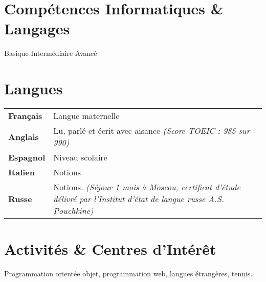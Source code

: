 \documentclass[10pt, a4paper]{article}
\begin{document}
\section{Compétences Informatiques \& Langages}
\vspace{-0.5em}
\begin{skillslisting}
	\skills{\threeskill}{\python}
	\skills{\twoskill}{\bootstrap}
	\skills{\threeskill}{\html}
	\skills{\threeskill}{\sass}
	\skills{\threeskill}{\js}
	\skills{\threeskill}{\jquery}
	\skills{\twoskill}{\react}
	\skills{\oneskill}{\angular}
	\skills{\threeskill}{\sql}
	\skills{\twoskill}{\git}
	\skills{\twoskill}{\patterns}
	\skills{\oneskill}{\visb}
	\skills{\twoskill}{\LaTeX}
	\skills{\twoskill}{\matlab}
\end{skillslisting}
\vspace{-1em}
\begin{footnotesize}
	\oneskill Basique \hfill
	\twoskill Intermédiaire \hfill
	\threeskill Avancé
\end{footnotesize}
\section{Langues}
\begin{tabu} to 
	\textbf{Français} & Langue maternelle\\
	\textbf{Anglais} & Lu, parlé et écrit avec aisance \em (Score TOEIC : 985 sur 990)\\
	\textbf{Espagnol} & Niveau scolaire\\
	\textbf{Italien} & Notions\\
	\textbf{Russe} & Notions. \em (Séjour 1 mois à Moscou, certificat d'étude délivré par l'Institut d'état de langue russe A.S. Pouchkine)
\end{tabu}


\section{Activités \& Centres d'Intérêt}
Programmation orientée objet, programmation web, langues étrangères, tennis.
\end{document}

